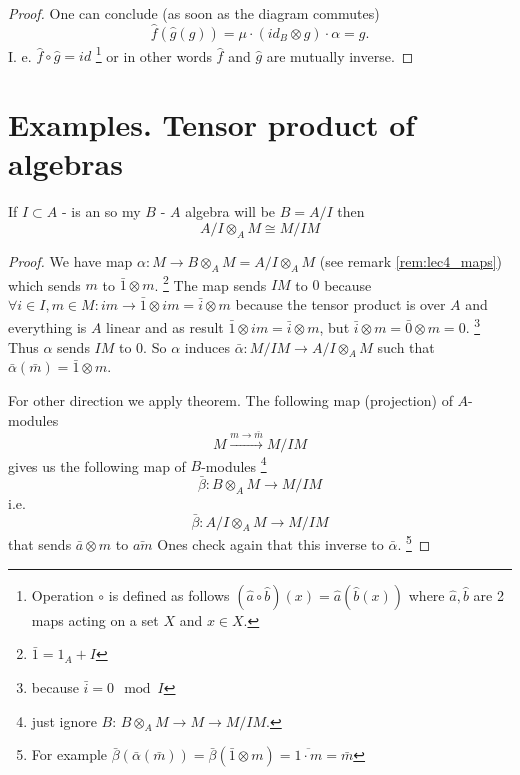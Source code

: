 \begin{theorem}
\begin{proof}
    One can conclude (as soon as the diagram commutes)
    \[
    \hat{f}\left(\hat{g}\left(g\right)\right) =
    \mu \cdot (id_B \otimes g) \cdot \alpha = g.
    \]
    I. e. $\hat{f}\circ\hat{g} = id$
    \footnote {
      Operation $\circ$ is defined as follows $(\hat{a} \circ \hat{b})(x) =
      \hat{a}(\hat{b}(x))$ where $\hat{a}, \hat{b}$ are 2 maps acting
      on a set $X$ and $x \in X$.
    }
    or in other words $\hat{f}$ and
    $\hat{g}$ are mutually inverse. 
  \end{proof}
  \label{thm:basechange}
\end{theorem}

\section{Examples. Tensor product of algebras}

\begin{proposition}
  If $I \subset A$ - is an  so my $B$ - $A$ algebra
  will be $B = A/I$ then
  \[
  A/I \otimes_A M \cong M/IM
  \]
  \begin{proof}
    We have map $\alpha: M \to B \otimes_A M = A/I \otimes_A M$
    (see remark \ref{rem:lec4_maps}) 
    which sends $m$ to $\bar{1} \otimes m$.
    \footnote{
      $\bar{1} = 1_A + I$
    }
    The map sends $IM$ to $0$
    because
    $\forall i \in I, m \in M : im \to \bar{1} \otimes im = \bar{i} \otimes m$
    because the tensor product is over $A$ and everything is $A$
    linear and as result $\bar{1} \otimes im = \bar{i} \otimes m$,
    but $\bar{i} \otimes m = \bar{0} \otimes m = 0$.
    \footnote{
      because
      $\bar{i} = 0 \mod I$
    }
    Thus $\alpha$ sends $IM$ to 0. So $\alpha$ induces
    $\bar{\alpha}: M/IM \to A/I \otimes_A M$ such that
    $\bar{\alpha}\left(\bar{m}\right) = \bar{1} \otimes m$.

    For other direction we apply  theorem. The
    following map (projection) of $A$-modules
    \[
    M \xrightarrow{m \to \bar{m}} M/IM
    \]
    gives us the following map of $B$-modules
    \footnote{
      just ignore $B$:
      $B \otimes_A M \to M \to M/IM$.
    }
    \[
    \bar{\beta}: B \otimes_A M \to M/IM
    \]
    i.e.
    \[
    \bar{\beta}: A/I \otimes_A M \to M/IM
    \]
    that sends $\bar{a} \otimes m$ to $\bar{am}$
    Ones check again that this inverse to $\bar{\alpha}$.
    \footnote{
      For example
      \(
      \bar{\beta}\left(\bar{\alpha}\left(\bar{m}\right)\right) =
      \bar{\beta}\left(\bar{1} \otimes m\right) = \overline{1 \cdot m} = \bar{m}
      \)
    }
  \end{proof}
  \label{prop:lec4_prop2}
\end{proposition}

